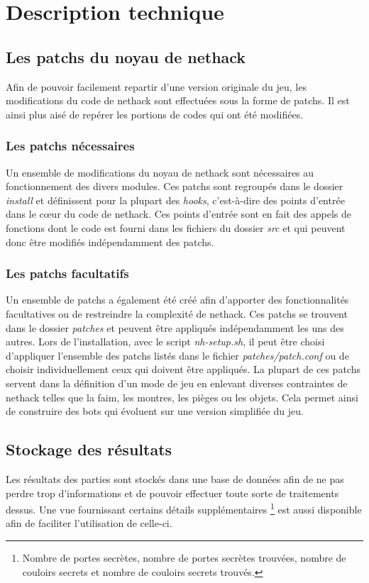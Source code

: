 \documentclass[10pt,a4paper]{report}
\begin{document}
\chapter{Description technique}
\section{Les patchs du noyau de nethack}
Afin de pouvoir facilement repartir d'une version originale du jeu, les
modifications du code de nethack sont effectuées sous la forme de patchs. Il
est ainsi plus aisé de repérer les portions de codes qui ont été modifiées.

\subsection{Les patchs nécessaires}
Un ensemble de modifications du noyau de nethack sont nécessaires au
fonctionnement des divers modules. Ces patchs sont regroupés dans le dossier
\emph{install} et définissent pour la plupart des \emph{hooks}, c'est-à-dire des
points d'entrée dans le cœur du code de nethack. Ces points d'entrée sont en
fait des appels de fonctions dont le code est fourni dans les fichiers du
dossier \emph{src} et qui peuvent donc être modifiés indépendamment des patchs.

\subsection{Les patchs facultatifs}
Un ensemble de patchs a également été créé afin d'apporter des fonctionnalités
facultatives ou de restreindre la complexité de nethack. Ces patchs se
trouvent dans le dossier \emph{patches} et peuvent être appliqués
indépendamment les uns des autres. Lors de l'installation, avec le script
\emph{nh-setup.sh}, il peut être choisi d'appliquer l'ensemble des patchs
listés dans le fichier \emph{patches/patch.conf} ou de choisir
individuellement ceux qui doivent être appliqués.
La plupart de ces patchs servent dans la définition d'un mode de jeu en
enlevant diverses contraintes de nethack telles que la faim, les montres, les
pièges ou les objets. Cela permet ainsi de construire des bots qui évoluent sur
une version simplifiée du jeu.

\section{Stockage des résultats}
Les résultats des parties sont stockés dans une base de données afin de ne pas perdre
trop d'informations et de pouvoir effectuer toute sorte de traitements dessus. Une vue
fournissant certains détails supplémentaires \footnote{Nombre de portes secrètes,
nombre de portes secrètes trouvées, nombre de couloirs secrets et nombre de couloirs
secrets trouvés.} est aussi disponible afin de faciliter l'utilisation de celle-ci.
\end{document}
